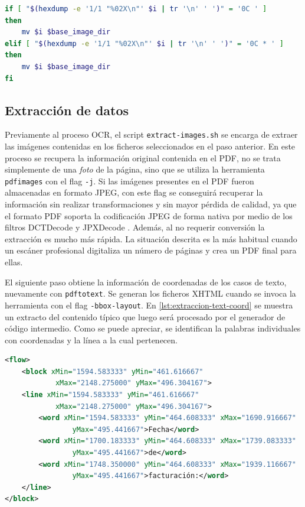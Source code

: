 \begin{lstlisting}[language=bash,caption={Detección del salto de página},label=lst:deteccion-salto-pagina]
if [ "$(hexdump -e '1/1 "%02X\n"' $i | tr '\n' ' ')" = '0C ' ]
then
    mv $i $base_image_dir
elif [ "$(hexdump -e '1/1 "%02X\n"' $i | tr '\n' ' ')" = '0C * ' ]
then
    mv $i $base_image_dir
fi
\end{lstlisting}

\subsection{Extracción de datos}

Previamente al proceso OCR, el script \verb|extract-images.sh| se encarga de extraer las imágenes contenidas en los ficheros seleccionados en el paso anterior. En este proceso se recupera la información original contenida en el PDF, no se trata simplemente de una \emph{foto} de la página, sino que se utiliza la herramienta \verb|pdfimages| con el flag \verb|-j|. Si las imágenes presentes en el PDF fueron almacenadas en formato JPEG, con este flag se conseguirá recuperar la información sin realizar transformaciones y sin mayor pérdida de calidad, ya que el formato PDF soporta la codificación JPEG de forma nativa por medio de los filtros DCTDecode y JPXDecode \cite[23]{adobe_book_iso32000-1}. Además, al no requerir conversión la extracción es mucho más rápida. La situación descrita es la más habitual cuando un escáner profesional digitaliza un número de páginas y crea un PDF final para ellas.

El siguiente paso obtiene la información de coordenadas de los casos de texto, nuevamente con \verb|pdftotext|. Se generan los ficheros XHTML cuando se invoca la herramienta con el flag \verb|-bbox-layout|. En \ref{lst:extraccion-text-coord} se muestra un extracto del contenido típico que luego será procesado por el generador de código intermedio. Como se puede apreciar, se identifican la palabras individuales con coordenadas y la línea a la cual pertenecen.

\begin{lstlisting}[language=XML,caption={Extracción de texto con información de coordenadas},label=lst:extraccion-text-coord]
<flow>
    <block xMin="1594.583333" yMin="461.616667" 
            xMax="2148.275000" yMax="496.304167">
    <line xMin="1594.583333" yMin="461.616667" 
            xMax="2148.275000" yMax="496.304167">
        <word xMin="1594.583333" yMin="464.608333" xMax="1690.916667" 
                yMax="495.441667">Fecha</word>
        <word xMin="1700.183333" yMin="464.608333" xMax="1739.083333"   
                yMax="495.441667">de</word>
        <word xMin="1748.350000" yMin="464.608333" xMax="1939.116667" 
                yMax="495.441667">facturación:</word>
    </line>
</block>
\end{lstlisting}

